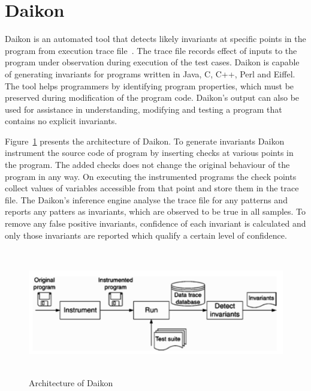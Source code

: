 \newpage

\section{Daikon}
Daikon is an automated tool that detects likely invariants at specific points in the program from execution trace file~\cite{ernst2007daikon}. The trace file records effect of inputs to the program under observation during execution of the test cases. Daikon is capable of generating invariants for programs written in Java, C, C++, Perl and Eiffel. The tool helps programmers by identifying program properties, which must be preserved during modification of the program code. Daikon's output can also be used for assistance in understanding, modifying and testing a program that contains no explicit invariants.

Figure~\ref{fig:daikon} presents the architecture of Daikon. To generate invariants Daikon instrument the source code of  program by inserting checks at various points in the program. The added checks does not change the original behaviour of the program in any way. On executing the instrumented programs the check points collect values of variables accessible from that point and store them in the trace file. The Daikon's inference engine analyse the trace file for any patterns and reports any patters as invariants, which are observed to be true in all samples. To remove any false positive invariants, confidence of each invariant is calculated and only those invariants are reported which qualify a certain level of confidence. 

\bigskip
\begin{figure}[H]
\centering
\includegraphics[width= 15.5cm,height=5.5cm]{chapter7/daikon.png}
\bigskip
\caption{Architecture of Daikon~\cite{ernst2001dynamically}}
\label{fig:daikon}
\end{figure}
\bigskip

